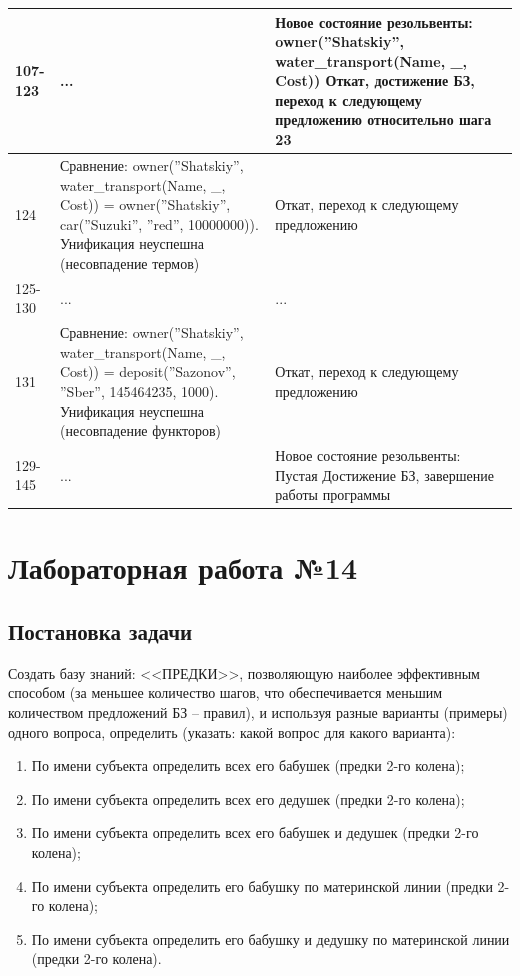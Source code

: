 \documentclass[12pt]{report}
\begin{document}
\begin{table}[H]
\begin{center}
\begin{tabular}{|p{1 cm}|p{10 cm}|p{8 cm}|}
			\hline
			107-123 & ... & Новое состояние резольвенты: \newline owner(''Shatskiy'', water\_transport(Name, \_, Cost)) \newline Откат, достижение БЗ, переход к следующему предложению относительно шага 23 \\
			\hline
			124 & Сравнение: \newline owner(''Shatskiy'', water\_transport(Name, \_, Cost)) = \newline owner(''Shatskiy'', car(''Suzuki'', ''red'', 10000000)). \newline Унификация неуспешна (несовпадение термов) & Откат, переход к следующему предложению \\
			\hline
			125-130 & ... & ... \\
			\hline
			131 & Сравнение: \newline owner(''Shatskiy'', water\_transport(Name, \_, Cost)) = \newline deposit(''Sazonov'', ''Sber'', 145464235, 1000). \newline Унификация неуспешна (несовпадение функторов) & Откат, переход к следующему предложению \\
			\hline
			129-145 & ... & Новое состояние резольвенты: Пустая \newline Достижение БЗ, завершение работы программы \\
			\hline
		\end{tabular}
	\end{center}
\end{table} 

\chapter*{Лабораторная работа №14}

\section*{Постановка задачи}

Создать базу знаний: <<ПРЕДКИ>>, позволяющую наиболее эффективным способом (за меньшее количество шагов, что обеспечивается меньшим количеством предложений БЗ – правил), и используя разные варианты (примеры) одного вопроса, определить (указать: какой вопрос для какого варианта):

\begin{enumerate}
	\item По имени субъекта определить всех его бабушек (предки 2-го колена);
	\item По имени субъекта определить всех его дедушек (предки 2-го колена);
	\item По имени субъекта определить всех его бабушек и дедушек (предки 2-го колена);
	\item По имени субъекта определить его бабушку по материнской линии (предки 2-го колена);
	\item По имени субъекта определить его бабушку и дедушку по материнской линии (предки 2-го колена).
\end{enumerate}
\end{document}

